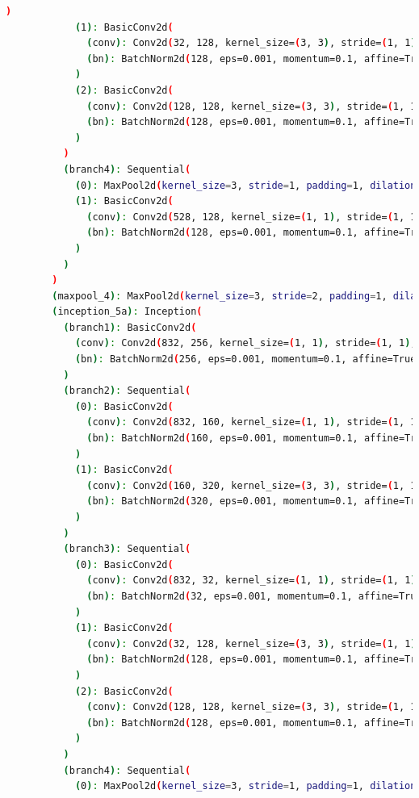 \documentclass[a4paper, 12pt]{article}
\begin{document}
\begin{lstlisting}[language=sh]
            )
            (1): BasicConv2d(
              (conv): Conv2d(32, 128, kernel_size=(3, 3), stride=(1, 1), padding=(1, 1), bias=False)
              (bn): BatchNorm2d(128, eps=0.001, momentum=0.1, affine=True, track_running_stats=True)
            )
            (2): BasicConv2d(
              (conv): Conv2d(128, 128, kernel_size=(3, 3), stride=(1, 1), padding=(1, 1), bias=False)
              (bn): BatchNorm2d(128, eps=0.001, momentum=0.1, affine=True, track_running_stats=True)
            )
          )
          (branch4): Sequential(
            (0): MaxPool2d(kernel_size=3, stride=1, padding=1, dilation=1, ceil_mode=False)
            (1): BasicConv2d(
              (conv): Conv2d(528, 128, kernel_size=(1, 1), stride=(1, 1), bias=False)
              (bn): BatchNorm2d(128, eps=0.001, momentum=0.1, affine=True, track_running_stats=True)
            )
          )
        )
        (maxpool_4): MaxPool2d(kernel_size=3, stride=2, padding=1, dilation=1, ceil_mode=False)
        (inception_5a): Inception(
          (branch1): BasicConv2d(
            (conv): Conv2d(832, 256, kernel_size=(1, 1), stride=(1, 1), bias=False)
            (bn): BatchNorm2d(256, eps=0.001, momentum=0.1, affine=True, track_running_stats=True)
          )
          (branch2): Sequential(
            (0): BasicConv2d(
              (conv): Conv2d(832, 160, kernel_size=(1, 1), stride=(1, 1), bias=False)
              (bn): BatchNorm2d(160, eps=0.001, momentum=0.1, affine=True, track_running_stats=True)
            )
            (1): BasicConv2d(
              (conv): Conv2d(160, 320, kernel_size=(3, 3), stride=(1, 1), padding=(1, 1), bias=False)
              (bn): BatchNorm2d(320, eps=0.001, momentum=0.1, affine=True, track_running_stats=True)
            )
          )
          (branch3): Sequential(
            (0): BasicConv2d(
              (conv): Conv2d(832, 32, kernel_size=(1, 1), stride=(1, 1), bias=False)
              (bn): BatchNorm2d(32, eps=0.001, momentum=0.1, affine=True, track_running_stats=True)
            )
            (1): BasicConv2d(
              (conv): Conv2d(32, 128, kernel_size=(3, 3), stride=(1, 1), padding=(1, 1), bias=False)
              (bn): BatchNorm2d(128, eps=0.001, momentum=0.1, affine=True, track_running_stats=True)
            )
            (2): BasicConv2d(
              (conv): Conv2d(128, 128, kernel_size=(3, 3), stride=(1, 1), padding=(1, 1), bias=False)
              (bn): BatchNorm2d(128, eps=0.001, momentum=0.1, affine=True, track_running_stats=True)
            )
          )
          (branch4): Sequential(
            (0): MaxPool2d(kernel_size=3, stride=1, padding=1, dilation=1, ceil_mode=False)

\end{lstlisting}
\end{document}
